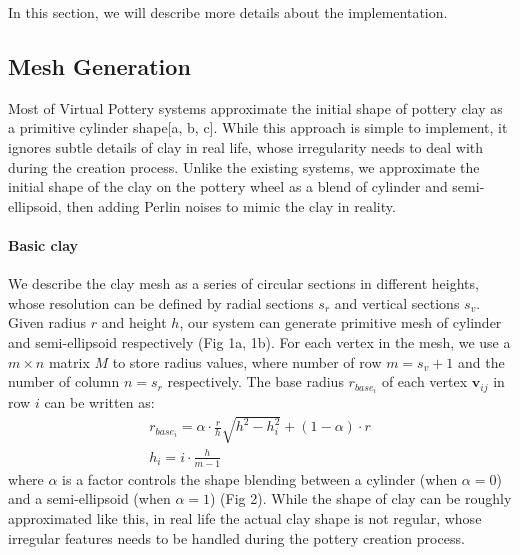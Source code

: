 In this section, we will describe more details about the implementation. 



\subsection{Mesh Generation}
\label{sec:4.1}

Most of Virtual Pottery systems approximate the initial shape of pottery clay as a primitive cylinder shape[a, b, c]. While this approach is simple to implement, it ignores subtle details of clay in real life, whose irregularity needs to deal with during the creation process. Unlike the existing systems, we approximate the initial shape of the clay on the pottery wheel as a blend of cylinder and semi-ellipsoid, then adding Perlin noises to mimic the clay in reality.


\paragraph{Basic clay} We describe the clay mesh as a series of circular sections in different heights, whose resolution can be defined by radial sections $s_{r}$ and vertical sections $s_{v}$. Given radius $r$ and height $h$, our system can generate primitive mesh of cylinder and semi-ellipsoid respectively (Fig 1a, 1b).
For each vertex in the mesh, we use a $m \times n$ matrix $M$ to store radius values, where number of row $m = s_{v} + 1$ and the number of column $n = s_{r}$ respectively. The base radius $r_{base_{i}}$ of each vertex $\mathbf{v}_{ij}$ in row $i$ can be written as: 
\begin{equation}
\begin{split}
r_{base_{i}} = \alpha \cdot \frac{r}{h} \sqrt{h^2 -  h_{i}^2} + (1 - \alpha) \cdot r \\
h_{i} = i \cdot \frac{h}{m-1}
\end{split}
\end{equation}
where $\alpha$ is a factor controls the shape blending between a  cylinder (when $\alpha=0$) and a semi-ellipsoid (when $\alpha=1$) (Fig 2).
While the shape of clay can be roughly approximated like this, in real life the actual clay shape is not regular, whose irregular features needs to be handled during the pottery creation process.

